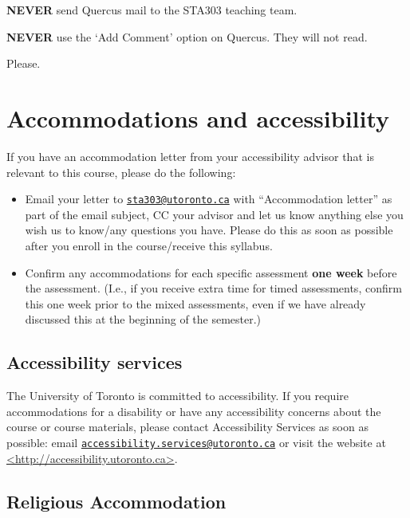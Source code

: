 \documentclass[
  openany]{book}
\begin{document}
\textbf{NEVER} send Quercus mail to the STA303 teaching team.

\textbf{NEVER} use the `Add Comment' option on Quercus. They will not read.

Please. 🥺

\hypertarget{accommodations-and-accessibility}{%
\section{Accommodations and accessibility}\label{accommodations-and-accessibility}}

If you have an accommodation letter from your accessibility advisor that is relevant to this course, please do the following:

\begin{itemize}
\item
  Email your letter to \href{mailto:sta303@utoronto.ca}{\nolinkurl{sta303@utoronto.ca}} with ``Accommodation letter'' as part of the email subject, CC your advisor and let us know anything else you wish us to know/any questions you have. Please do this as soon as possible after you enroll in the course/receive this syllabus.
\item
  Confirm any accommodations for each specific assessment \textbf{one week} before the assessment. (I.e., if you receive extra time for timed assessments, confirm this one week prior to the mixed assessments, even if we have already discussed this at the beginning of the semester.)
\end{itemize}

\hypertarget{accessibility-services}{%
\subsection{Accessibility services}\label{accessibility-services}}

The University of Toronto is committed to accessibility. If you require accommodations for a disability or have any accessibility concerns about the course or course materials, please contact Accessibility Services as soon as possible: email \href{mailto:accessibility.services@utoronto.ca}{\nolinkurl{accessibility.services@utoronto.ca}} or visit the website at \href{http://accessibility.utoronto.ca/}{\textless http://accessibility.utoronto.ca\textgreater{}}.

\hypertarget{religious-accommodation}{%
\subsection{Religious Accommodation}\label{religious-accommodation}}
\end{document}
